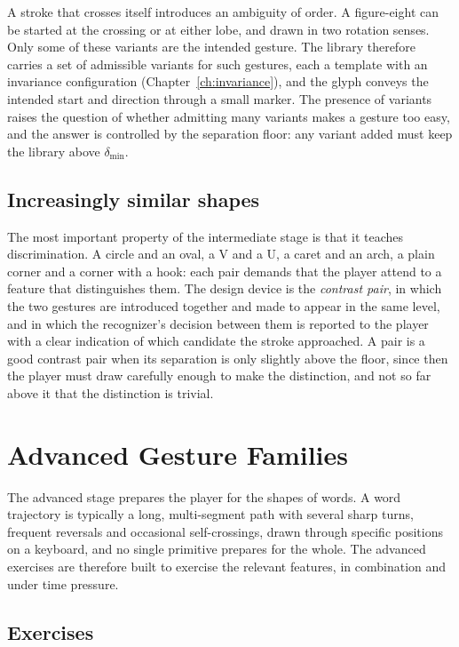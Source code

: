 A stroke that crosses itself introduces an ambiguity of order. A figure-eight can be started at the crossing or at either lobe, and drawn in two rotation senses. Only some of these variants are the intended gesture. The library therefore carries a set of admissible variants for such gestures, each a template with an invariance configuration (Chapter~\ref{ch:invariance}), and the glyph conveys the intended start and direction through a small marker. The presence of variants raises the question of whether admitting many variants makes a gesture too easy, and the answer is controlled by the separation floor: any variant added must keep the library above $\delta_{\min}$.

\section{Increasingly similar shapes}

The most important property of the intermediate stage is that it teaches discrimination. A circle and an oval, a V and a U, a caret and an arch, a plain corner and a corner with a hook: each pair demands that the player attend to a feature that distinguishes them. The design device is the \emph{contrast pair}, in which the two gestures are introduced together and made to appear in the same level, and in which the recognizer's decision between them is reported to the player with a clear indication of which candidate the stroke approached. A pair is a good contrast pair when its separation is only slightly above the floor, since then the player must draw carefully enough to make the distinction, and not so far above it that the distinction is trivial.\evS

\chapter{Advanced Gesture Families}\label{ch:advanced}

The advanced stage prepares the player for the shapes of words. A word trajectory is typically a long, multi-segment path with several sharp turns, frequent reversals and occasional self-crossings, drawn through specific positions on a keyboard, and no single primitive prepares for the whole. The advanced exercises are therefore built to exercise the relevant features, in combination and under time pressure.

\section{Exercises}


